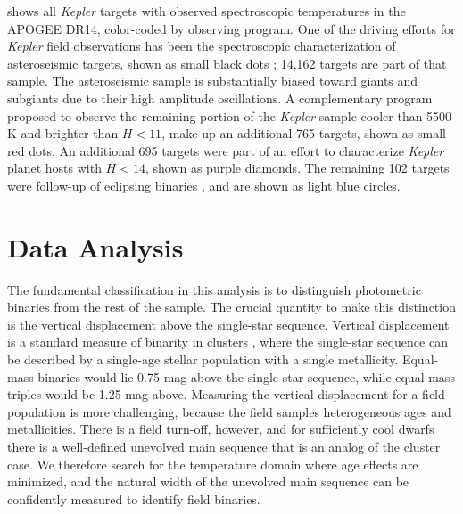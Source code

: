 \documentclass[manuscript]{aastex6}
\newcommand{\Kepler}{\mbox{\textit{Kepler}}}
\newcommand{\Teff}{\ensuremath{T_{eff}}}
\begin{document}
\begin{figure*}[htb]
    \centering
    \caption{\emph{Left:} \Teff-\(M_K\) diagram for the APOGEE observations of
        \Kepler{} targets. Asteroseismic targets are shown as black dots. The
        cool dwarf sample is shown as red dots. The light blue dots indicate 
        eclipsing binary targets and purple dots are Kepler Objects of 
        Interest. A binary sequence is clearly visible on the lower main
        sequence. A representative error bar for the cool dwarf sample is 
        shown on the right-hand side. \emph{Right:} A density plot of the 
        full APOGEE sample. To preserve the dynamic range of the dwarf 
        sequence, the red clump was allowed to saturate. The bin size is 100 K
    horizontally and 0.02 mag vertically.}\label{fig:apogee_selection}
\end{figure*}

 shows all \Kepler{} targets with observed
spectroscopic temperatures in the APOGEE DR14, color-coded by observing
program. One of the driving efforts for \Kepler{} field observations has been
the spectroscopic characterization of asteroseismic targets, shown as small
black dots \citep{Zasowski17,Pinsonneault18}; 14,162 targets are part of that
sample. The asteroseismic sample is substantially biased toward giants 
and subgiants due to their high amplitude oscillations. A complementary 
program proposed to observe the remaining portion of the \Kepler{} sample 
cooler than 5500 K and brighter than \(H < 11\), make up an additional 765 
targets, shown as small red dots. An additional 695 targets were part of an 
effort to characterize \Kepler{} planet hosts with \(H < 14\), shown as purple 
diamonds. The remaining 102 targets were follow-up of eclipsing binaries 
\citep{Prsa11,Slawson11}, and are shown as light blue circles.  

\section{Data Analysis}
\label{sec:analysis}

The fundamental classification in this analysis is to distinguish photometric
binaries from the rest of the sample. The crucial quantity to make this
distinction is the 
vertical displacement above the single-star sequence. Vertical 
displacement is a standard measure of binarity in clusters 
\citep{Mermilliod92}, where the single-star sequence can be described by a
single-age stellar population with a single metallicity. Equal-mass binaries
would lie 0.75 mag above the single-star sequence, while equal-mass triples would be
1.25 mag above. Measuring the vertical displacement for a field population is 
more challenging, because the
field samples heterogeneous ages and metallicities. There is a
field turn-off, however, and for sufficiently cool dwarfs there is a
well-defined unevolved main sequence that is an analog of the cluster case. We
therefore search for the temperature domain where age effects are minimized, 
and the natural width of the unevolved main sequence can be confidently
measured to identify field binaries.
\end{document}
